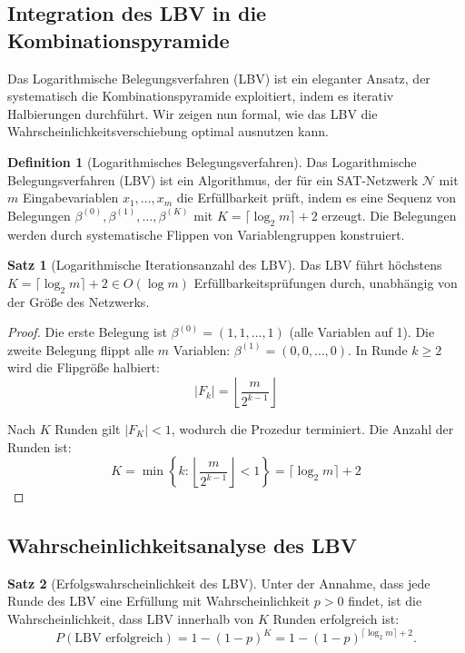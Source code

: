 ﻿\documentclass[a4paper,12pt]{article}
\theoremstyle{definition}
\newtheorem{definition}{Definition}
\newtheorem{satz}{Satz}
\begin{document}
\subsection{Integration des LBV in die Kombinationspyramide}

Das Logarithmische Belegungsverfahren (LBV) ist ein eleganter Ansatz, der systematisch die Kombinationspyramide exploitiert, indem es iterativ Halbierungen durchführt. Wir zeigen nun formal, wie das LBV die Wahrscheinlichkeitsverschiebung optimal ausnutzen kann.

\begin{definition}[Logarithmisches Belegungsverfahren]
Das Logarithmische Belegungsverfahren (LBV) ist ein Algorithmus, der für ein SAT-Netzwerk $\mathcal{N}$ mit $m$ Eingabevariablen $x_1, \ldots, x_m$ die Erfüllbarkeit prüft, indem es eine Sequenz von Belegungen $\beta^{(0)}, \beta^{(1)}, \ldots, \beta^{(K)}$ mit $K = \lceil \log_2 m \rceil + 2$ erzeugt. Die Belegungen werden durch systematische Flippen von Variablengruppen konstruiert.
\end{definition}

\begin{satz}[Logarithmische Iterationsanzahl des LBV]
\label{satz:lbv-iterations}
Das LBV führt höchstens $K = \lceil \log_2 m \rceil + 2 \in O(\log m)$ Erfüllbarkeitsprüfungen durch, unabhängig von der Größe des Netzwerks.
\end{satz}

\begin{proof}
Die erste Belegung ist $\beta^{(0)} = (1, 1, \ldots, 1)$ (alle Variablen auf 1). Die zweite Belegung flippt alle $m$ Variablen: $\beta^{(1)} = (0, 0, \ldots, 0)$. In Runde $k \geq 2$ wird die Flipgröße halbiert:
\[
|F_k| = \left\lfloor \frac{m}{2^{k-1}} \right\rfloor
\]

Nach $K$ Runden gilt $|F_K| < 1$, wodurch die Prozedur terminiert. Die Anzahl der Runden ist:
\[
K = \min\left\{ k : \left\lfloor \frac{m}{2^{k-1}} \right\rfloor < 1 \right\} = \lceil \log_2 m \rceil + 2
\]
\end{proof}

\subsection{Wahrscheinlichkeitsanalyse des LBV}

\begin{satz}[Erfolgswahrscheinlichkeit des LBV]
\label{satz:lbv-success}
Unter der Annahme, dass jede Runde des LBV eine Erfüllung mit Wahrscheinlichkeit $p > 0$ findet, ist die Wahrscheinlichkeit, dass LBV innerhalb von $K$ Runden erfolgreich ist:
\[
P(\text{LBV erfolgreich}) = 1 - (1-p)^K = 1 - (1-p)^{\lceil \log_2 m \rceil + 2}.
\]
\end{satz}
\end{document}
